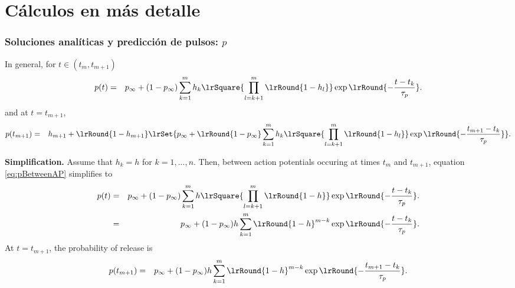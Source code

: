 \documentclass[8pt]{beamer}
\begin{document}
\section{Cálculos en más detalle}
\begin{frame}
\frametitle{Soluciones analíticas y predicción de pulsos: $p$}
\begin{small}
In general, for $t \in (t_{m},t_{m+1})$
\begin{eqnarray}
p(t)
&=& 
p_{\infty} + (1-p_{\infty}) 
\sum_{k=1}^{m} 
h_k \lrSquare{
\prod_{l=k+1}^{m}  
\lrRound{1- h_{l}}} 
\exp \lrRound{-\frac{t-t_k}{\tau_p}}. 
\label{eq:pBetweenAP}
\end{eqnarray}
and at  $t=t_{m+1}$, 
\begin{eqnarray}
p(t_{m+1})
&=&h_{m+1} + \lrRound{1-h_{m+1}}
\lrSet{
 p_{\infty} + \lrRound{1-p_{\infty}} 
\sum_{k=1}^{m} 
h_k \lrSquare{
\prod_{l=k+1}^{m}  
\lrRound{1- h_{l}}} 
\exp \lrRound{-\frac{t_{m+1}-t_k}{\tau_p}}
}. 
\label{eq:pAP}
\end{eqnarray}

\textbf{Simplification.} 
Assume that $h_k =h$ for
$k=1,...,n$.  Then, between action potentials occuring at times $t_m$
and $t_{m+1}$,  equation \eqref{eq:pBetweenAP} simplifies to
\begin{eqnarray*}
p(t)
&=& 
p_{\infty} + (1-p_{\infty}) 
\sum_{k=1}^{m} 
h \lrSquare{
\prod_{l=k+1}^{m}  
\lrRound{1- h}} 
\exp \lrRound{-\frac{t-t_k}{\tau_p}}. 
\nonumber \\ 
&=& 
p_{\infty} + (1-p_{\infty}) 
h \sum_{k=1}^{m} 
\lrRound{1- h}^{m-k} 
\exp \lrRound{-\frac{t-t_k}{\tau_p}}. 
\end{eqnarray*}
At $t=t_{m+1}$, the probability of release is
\begin{eqnarray*}
p(t_{m+1})
&=&
p_{\infty} + (1-p_{\infty}) 
h \sum_{k=1}^{m} 
\lrRound{1- h}^{m-k} 
\exp \lrRound{-\frac{t_{m+1}-t_k}{\tau_p}}. 
\end{eqnarray*}
\end{small}
\end{frame}
\end{document}
